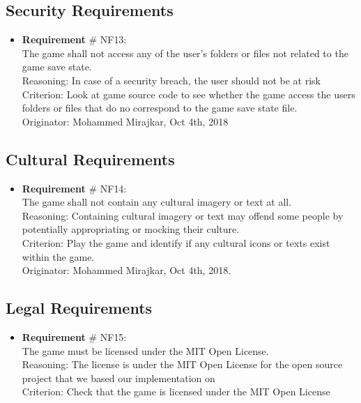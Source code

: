 \documentclass[12pt, titlepage]{article}
\renewcommand{\bf}{\textbf}
\begin{document}
\subsection{Security Requirements}
\begin{itemize}
	\item  {\color {blue}\bf{ Requirement}}{\color {blue} \# NF{\color {blue}13:}}\\
	      The game shall not  access any of the user's folders or files {\color {blue} not related to the game save state.}\\
	      Reasoning: In case of a security breach, the user should not be at risk\\
	      Criterion: Look at game source code to see whether the game access the users folders or files {\color{blue} that do no correspond to the game save state file.}\\
	      Originator: Mohammed Mirajkar, Oct 4th, 2018

\end{itemize}

\subsection{Cultural Requirements}
\begin{itemize}
	\item  {\color {blue}\bf{ Requirement}} {\color {blue} \# NF{\color {blue}14:}}\\
	      The game shall not contain any cultural imagery or text at all.\\
	      Reasoning: Containing cultural imagery or text may offend some people by potentially appropriating or mocking their culture.\\
	      Criterion:  Play the game and identify if any cultural icons or texts exist within the game.\\
	      Originator: Mohammed Mirajkar, Oct 4th, 2018.
\end{itemize}

\subsection{Legal Requirements}
\begin{itemize}
	\item {\color {blue}\bf{ Requirement}}{\color {blue} \# NF{\color {blue}15:}}\\
		The game must be licensed under the MIT Open License.\\
	      Reasoning: The license is under the MIT Open License for the open source project that we based our implementation on\\
	      Criterion:  Check that the game is licensed under the MIT Open License

\end{itemize}
\end{document}

